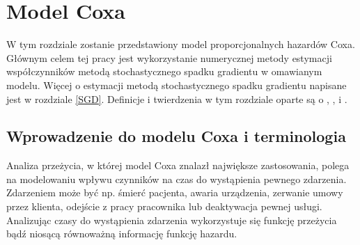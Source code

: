 \chapter{Model Coxa}\label{chap2}
W tym rozdziale zostanie przedstawiony model proporcjonalnych hazardów Coxa. Głównym celem tej pracy jest wykorzystanie numerycznej metody estymacji współczynników metodą stochastycznego spadku gradientu w omawianym modelu. Więcej o estymacji metodą stochastycznego spadku gradientu napisane jest w rozdziale \ref{SGD}. Definicje i twierdzenia w tym rozdziale oparte są o \cite{cox}, \cite{ther}, \cite{assel} i \cite{burzyk1}.



\section{Wprowadzenie do modelu Coxa i terminologia}

Analiza przeżycia, w której model Coxa znalazł największe zastosowania, polega na modelowaniu wpływu czynników na czas
do wystąpienia pewnego zdarzenia. Zdarzeniem może być np. śmierć pacjenta, awaria urządzenia, zerwanie umowy przez klienta, odejście z pracy pracownika lub deaktywacja pewnej usługi. Analizując czasy do wystąpienia zdarzenia wykorzystuje się funkcję przeżycia bądź niosącą równoważną informację funkcję hazardu.

